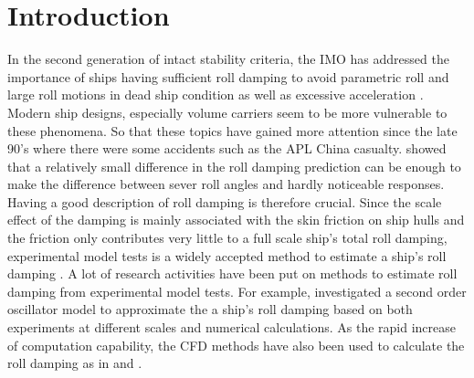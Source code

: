 \section{Introduction}
\label{se:introduction}

In the second generation of intact stability criteria, the IMO has addressed the importance of ships having sufficient roll damping to avoid parametric roll and large roll motions in dead ship condition as well as excessive acceleration \parencite{imo_finalization_2016}.
Modern ship designs, especially volume carriers seem to be more vulnerable to these phenomena. So that these topics have gained more attention since the late 90’s where there were some accidents such as the APL China casualty.
\parencite{soder_ikeda_2019} showed that a relatively small difference in the roll damping prediction can be enough to make the difference between sever roll angles and hardly noticeable responses. Having a good description of roll damping is therefore crucial.
Since the scale effect of the damping is mainly associated with the skin friction on ship hulls and the friction only contributes very little to a full scale ship's total roll damping, experimental model tests is a widely accepted method to estimate a ship's roll damping \parencite{imo_1200_2006}. A lot of research activities have been put on methods to estimate roll damping from experimental model tests. For example, \parencite[]{hua_approximation_2011} investigated a second order oscillator model to approximate the a ship's roll damping based on both experiments at different scales and numerical calculations.
As the rapid increase of computation capability, the CFD methods have also been used to calculate the roll damping as in \parencite{kristiansen_experimental_2014} and \parencite{henry_peter_piehl_ship_2016}.  

